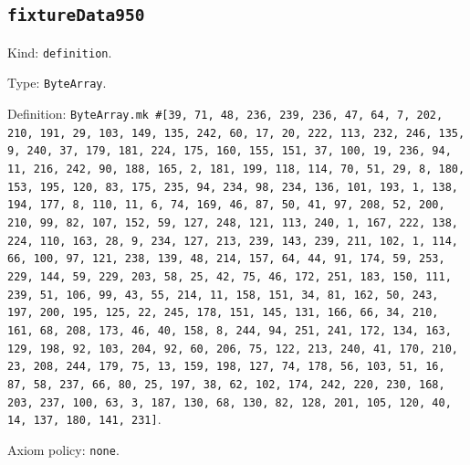 \documentclass[11pt]{article}
\begin{document}
\subsection*{\texttt{fixtureData950}}
\noindent Kind: \texttt{definition}.\par
\noindent Type: \texttt{ByteArray}.\par
\noindent Definition: \texttt{ByteArray.mk \#[39, 71, 48, 236, 239, 236, 47, 64, 7, 202, 210, 191, 29, 103, 149, 135, 242, 60, 17, 20, 222, 113, 232, 246, 135, 9, 240, 37, 179, 181, 224, 175, 160, 155, 151, 37, 100, 19, 236, 94, 11, 216, 242, 90, 188, 165, 2, 181, 199, 118, 114, 70, 51, 29, 8, 180, 153, 195, 120, 83, 175, 235, 94, 234, 98, 234, 136, 101, 193, 1, 138, 194, 177, 8, 110, 11, 6, 74, 169, 46, 87, 50, 41, 97, 208, 52, 200, 210, 99, 82, 107, 152, 59, 127, 248, 121, 113, 240, 1, 167, 222, 138, 224, 110, 163, 28, 9, 234, 127, 213, 239, 143, 239, 211, 102, 1, 114, 66, 100, 97, 121, 238, 139, 48, 214, 157, 64, 44, 91, 174, 59, 253, 229, 144, 59, 229, 203, 58, 25, 42, 75, 46, 172, 251, 183, 150, 111, 239, 51, 106, 99, 43, 55, 214, 11, 158, 151, 34, 81, 162, 50, 243, 197, 200, 195, 125, 22, 245, 178, 151, 145, 131, 166, 66, 34, 210, 161, 68, 208, 173, 46, 40, 158, 8, 244, 94, 251, 241, 172, 134, 163, 129, 198, 92, 103, 204, 92, 60, 206, 75, 122, 213, 240, 41, 170, 210, 23, 208, 244, 179, 75, 13, 159, 198, 127, 74, 178, 56, 103, 51, 16, 87, 58, 237, 66, 80, 25, 197, 38, 62, 102, 174, 242, 220, 230, 168, 203, 237, 100, 63, 3, 187, 130, 68, 130, 82, 128, 201, 105, 120, 40, 14, 137, 180, 141, 231]}.\par
\noindent Axiom policy: \texttt{none}.\par
\end{document}
